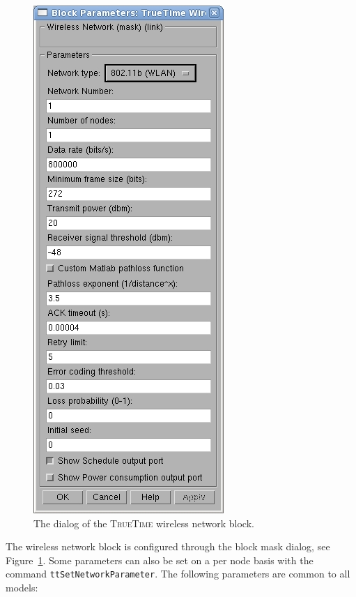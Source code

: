 \documentclass[final,twoside]{rapport}
\begin{document}
\begin{figure}[tbp]
  \centerline{\includegraphics[scale=0.4]{wnwdialog}}
  \caption{The dialog of the \textsc{TrueTime} wireless network block.}
  \label{fig:wnwdialog}
\end{figure}

The wireless network block is configured through the block mask
dialog, see Figure~\ref{fig:wnwdialog}. Some parameters can also be
set on a per node basis with the command {\tt ttSetNetworkParameter}.
The following parameters are common to all models:
\end{document}
